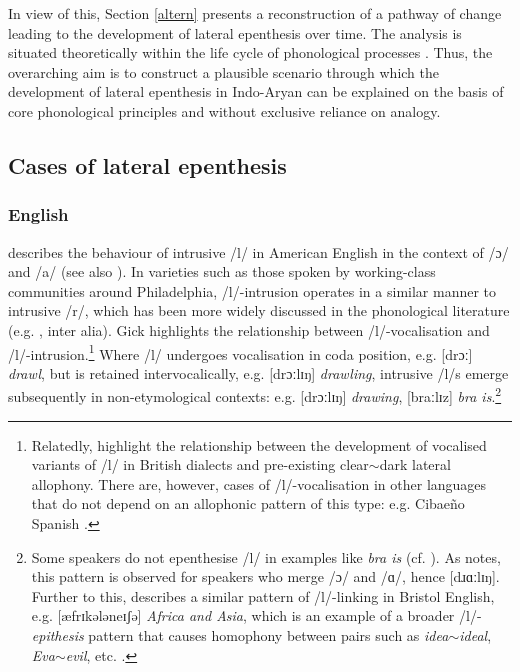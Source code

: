 \documentclass[output=paper,colorlinks,citecolor=brown]{langscibook}
\begin{document}
In view of this, Section \ref{altern} presents a reconstruction of a pathway of change leading to the development of lateral epenthesis over time.  The analysis is situated theoretically within the life cycle of phonological processes \citep{Bermúdez-Otero2015, Bermúdez-OteroTrousdale2012, Iosad2020, Ramsammy2015, Roberts2012, Sen2016, Turton2016, Turton2017}. Thus, the overarching aim is to construct a plausible scenario through which the development of lateral epenthesis in Indo-Aryan can be explained on the basis of core phonological principles and without exclusive reliance on analogy.

\subsection{Cases of lateral epenthesis}
\subsubsection{English}\label{english}
\citet{gickphono} describes the behaviour of intrusive /l/ in American English in the context of /ɔ/ and /a/ (see also \citealt{Gick2002}).  In varieties such as those spoken by working-class communities around Philadelphia, /l/-intrusion operates in a similar manner to intrusive /r/, which has been more widely discussed in the phonological literature (e.g. \cite{Barras2011, Hall2013, Mompeán-GonzálezMompeán-Gillamón2009, Sóskuthy2013, Uffman2007b}, inter alia).  Gick highlights the relationship between /l/-vocalisation and /l/-intrusion.\footnote{Relatedly, \citet{JohnsonBritain2007} highlight the relationship between the development of vocalised variants of /l/ in British dialects and pre-existing clear$\sim$dark lateral allophony. There are, however, cases of /l/-vocalisation in other languages that do not depend on an allophonic pattern of this type: e.g. Cibae\~{n}o Spanish \citep{Alba1979}.} Where /l/ undergoes vocalisation in coda position, e.g. [drɔː] \textit{drawl}, but is retained intervocalically, e.g. [drɔːlɪŋ] \textit{drawling}, intrusive /l/s emerge subsequently in non-etymological contexts: e.g. [drɔːlɪŋ] \textit{drawing}, [braːlɪz] \textit{bra is}.\footnote{Some speakers do not epenthesise /l/ in examples like \textit{bra is} (cf. \citealt[741]{RBO&Börjars2006}). As \citet[178]{Gick2002} notes, this pattern is observed for speakers who merge /ɔ/ and /ɑ/, hence [dɹɑːlɪŋ]. Further to this, \citet{Weissmann1970} describes a similar pattern of /l/-linking in Bristol English, e.g. [æfrɪkələneɪʃə] \textit{Africa and Asia}, which is an example of a broader /l/-\textit{epithesis} pattern \citep{gickphono} that causes homophony between pairs such as \textit{idea$\sim$ideal}, \textit{Eva$\sim$evil}, etc. \citep{Trudgill1999}.}
\end{document}
